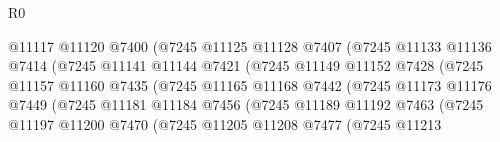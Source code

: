 \begin{lexlean}{R0}
\begin{coremodule}
                                    @11117
                                    @11120
                                    @7400
                                    (@7245
                                      @11125
                                      @11128
                                      @7407
                                      (@7245
                                        @11133
                                        @11136
                                        @7414
                                        (@7245
                                          @11141
                                          @11144
                                          @7421
                                          (@7245
                                            @11149
                                            @11152
                                            @7428
                                            (@7245
                                              @11157
                                              @11160
                                              @7435
                                              (@7245
                                                @11165
                                                @11168
                                                @7442
                                                (@7245
                                                  @11173
                                                  @11176
                                                  @7449
                                                  (@7245
                                                    @11181
                                                    @11184
                                                    @7456
                                                    (@7245
                                                      @11189
                                                      @11192
                                                      @7463
                                                      (@7245
                                                        @11197
                                                        @11200
                                                        @7470
                                                        (@7245
                                                          @11205
                                                          @11208
                                                          @7477
                                                          (@7245
                                                            @11213

\end{coremodule}
\end{lexlean}
